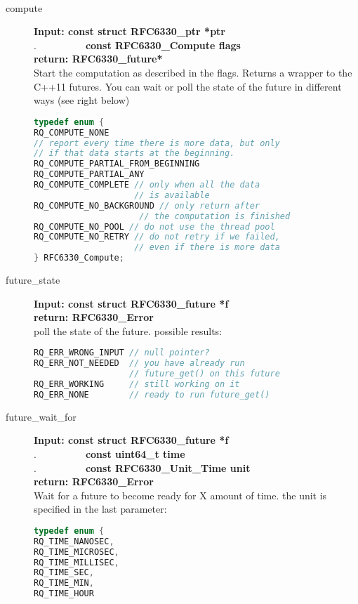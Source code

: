 \documentclass[11pt,a4paper]{refart}
\begin{document}
\label{computation}\\
\begin{description}
\item[compute] \textbf{Input: const struct RFC6330\_ptr *ptr}\\
.\ \ \ \ \ \ \ \ \ \ \textbf{const RFC6330\_Compute flags}\\
\textbf{return: RFC6330\_future*}\\
Start the computation as described in the flags. Returns a wrapper to the C++11 futures. You can wait or poll the state of the future in different ways (see right below)\\
\begin{lstlisting}[language=C]
typedef enum {
RQ_COMPUTE_NONE 
// report every time there is more data, but only
// if that data starts at the beginning.
RQ_COMPUTE_PARTIAL_FROM_BEGINNING
RQ_COMPUTE_PARTIAL_ANY
RQ_COMPUTE_COMPLETE // only when all the data
					// is available
RQ_COMPUTE_NO_BACKGROUND // only return after
					 // the computation is finished
RQ_COMPUTE_NO_POOL // do not use the thread pool
RQ_COMPUTE_NO_RETRY // do not retry if we failed,
					// even if there is more data
} RFC6330_Compute;
\end{lstlisting}
\item[future\_state] \textbf{Input: const struct RFC6330\_future *f}\\
\textbf{return: RFC6330\_Error}\\
poll the state of the future. possible results:
\begin{lstlisting}[language=C]
RQ_ERR_WRONG_INPUT // null pointer?
RQ_ERR_NOT_NEEDED  // you have already run
				   // future_get() on this future
RQ_ERR_WORKING	   // still working on it
RQ_ERR_NONE		   // ready to run future_get()
\end{lstlisting}
\newpage
\item[future\_wait\_for] \textbf{Input: const struct RFC6330\_future *f}\\
.\ \ \ \ \ \ \ \ \ \ \textbf{const uint64\_t time}\\
.\ \ \ \ \ \ \ \ \ \ \textbf{const RFC6330\_Unit\_Time unit}\\
\textbf{return: RFC6330\_Error}\\
Wait for a future to become ready for X amount of time. the unit is specified in the
last parameter:
\begin{lstlisting}[language=C]
typedef enum {
RQ_TIME_NANOSEC,
RQ_TIME_MICROSEC,
RQ_TIME_MILLISEC,
RQ_TIME_SEC,
RQ_TIME_MIN,
RQ_TIME_HOUR

\end{lstlisting}
\end{description}
\end{document}

